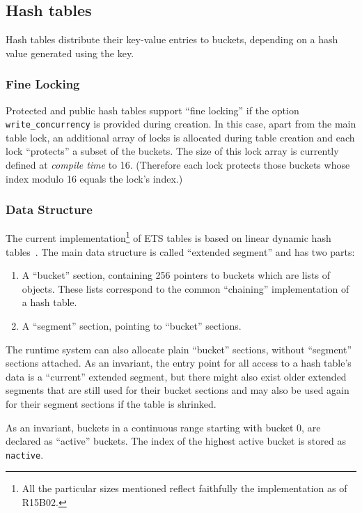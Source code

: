 \documentclass[aps,pre,preprint,nofootinbib]{revtex4}
\begin{document}
\subsection{Hash tables}

Hash tables distribute their key-value entries to buckets, depending on a hash value generated using the key.

\subsubsection{Fine Locking}

Protected and public hash tables support ``fine locking'' if the option \verb|write_concurrency| is provided during creation.
In this case, apart from the main table lock, an additional array of locks is allocated during table creation and each lock ``protects'' a subset of the buckets.
The size of this lock array is currently defined at \emph{compile time} to 16.
(Therefore each lock protects those buckets whose index modulo 16 equals the lock's index.)

\subsubsection{Data Structure}

The current implementation\footnote{All the particular sizes mentioned reflect faithfully the implementation as of R15B02.} of ETS tables is based on linear dynamic hash tables~\cite{Larson}.
The main data structure is called ``extended segment'' and has two parts:
\begin{enumerate}
\item A ``bucket'' section, containing 256 pointers to buckets which are lists of objects.
  These lists correspond to the common ``chaining'' implementation of a hash table.
\item A ``segment'' section, pointing to ``bucket'' sections.
\end{enumerate}
The runtime system can also allocate plain ``bucket'' sections, without ``segment'' sections attached.
As an invariant, the entry point for all access to a hash table's data is a ``current'' extended segment, but there might also exist older extended segments that are still used for their bucket sections and may also be used again for their segment sections if the table is shrinked.

As an invariant, buckets in a continuous range starting with bucket 0, are declared as ``active'' buckets.
The index of the highest active bucket is stored as \verb|nactive|.
\end{document}
